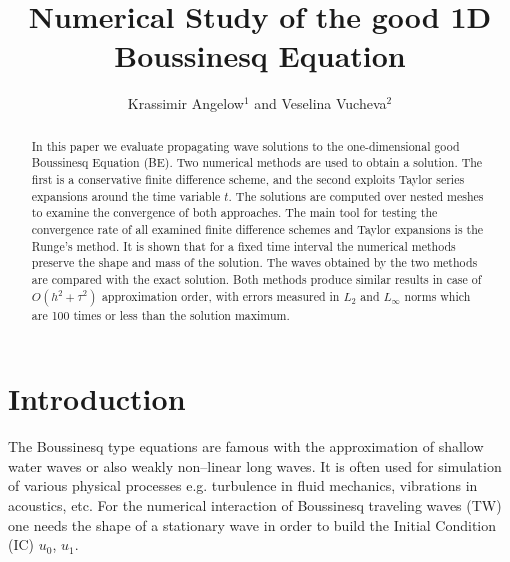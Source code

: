 \documentclass[%
 aip,
cp,  
 amsmath,amssymb,
 reprint,
]{iopconfser}
\begin{document}
\title{Numerical Study of the good 1D Boussinesq Equation}

\author{Krassimir Angelow$^{1}$ and Veselina Vucheva$^{2}$}




\begin{abstract}
In this paper we evaluate propagating wave solutions to the one-dimensional good Boussinesq Equation (BE).
Two numerical methods are used to obtain a solution. The first is a conservative finite difference scheme, and the second exploits Taylor series expansions around the time variable $t$. 
The solutions are computed over nested meshes to examine the convergence of both approaches. The main tool for testing the convergence rate of all examined finite difference schemes and Taylor expansions is the Runge's method. It is shown that for a fixed time interval the numerical methods preserve the shape and mass of the solution. The waves obtained by the two methods are compared with the exact solution.
Both methods produce similar results in case of $O(h^{2} + \tau^2 )$ approximation order, with errors measured in $L_2$ and $L_\infty$ norms which are 100 times or less than the solution maximum.
\end{abstract}

\section{\label{sec:level1}Introduction}

The Boussinesq type equations are famous with the approximation of shallow water waves or also weakly non--linear long waves. It is often used for simulation of various physical processes e.g. turbulence in fluid mechanics, vibrations in acoustics, etc. For the numerical interaction of Boussinesq traveling waves (TW) one needs the shape of a stationary wave in order to build the Initial Condition (IC) $u_0$, $u_1$.
\end{document}
